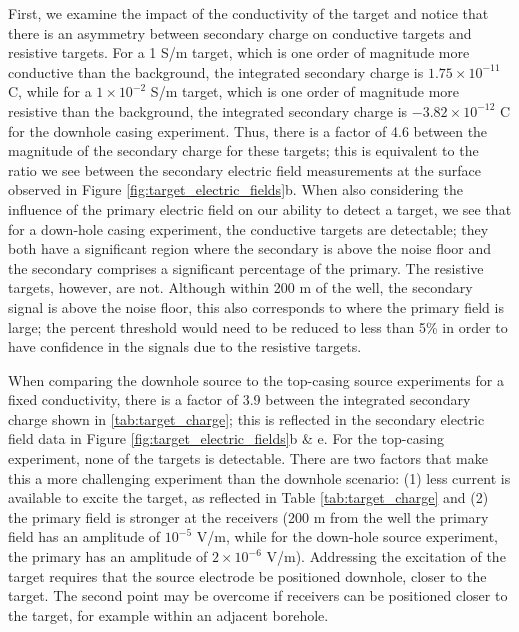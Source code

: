 





First, we examine the impact of the conductivity of the target and notice that there is an asymmetry between secondary charge on conductive targets and resistive targets. For a 1 S/m target, which is one order of magnitude more conductive than the background, the integrated secondary charge is $1.75 \times 10^{-11}$ C, while for a $1\times10^{-2}$ S/m target, which is one order of magnitude more resistive than the background, the integrated secondary charge is $-3.82 \times 10^{-12}$ C for the downhole casing experiment. Thus, there is a factor of 4.6 between the magnitude of the secondary charge for these targets; this is equivalent to the ratio we see between the secondary electric field measurements at the surface observed in Figure \ref{fig:target_electric_fields}b. When also considering the influence of the primary electric field on our ability to detect a target, we see that for a down-hole casing experiment, the conductive targets are detectable; they both have a significant region where the secondary is above the noise floor and the secondary comprises a significant percentage of the primary. The resistive targets, however, are not. Although within 200 m of the well, the secondary signal is above the noise floor, this also corresponds to where the primary field is large; the percent threshold would need to be reduced to less than 5\% in order to have confidence in the signals due to the resistive targets.

When comparing the downhole source to the top-casing source experiments for a fixed conductivity, there is a factor of 3.9 between the integrated secondary charge shown in \ref{tab:target_charge}; this is reflected in the secondary electric field data in Figure \ref{fig:target_electric_fields}b \& e.  For the top-casing experiment, none of the targets is detectable. There are two factors that make this a more challenging experiment than the downhole scenario: (1) less current is available to excite the target, as reflected in Table \ref{tab:target_charge} and (2) the primary field is stronger at the receivers (200 m from the well the primary field has an amplitude of $10^{-5}$ V/m, while for the down-hole source experiment, the primary has an amplitude of $2 \times 10^{-6}$ V/m). Addressing the excitation of the target requires that the source electrode be positioned downhole, closer to the target. The second point may be overcome if receivers can be positioned closer to the target, for example within an adjacent borehole.

